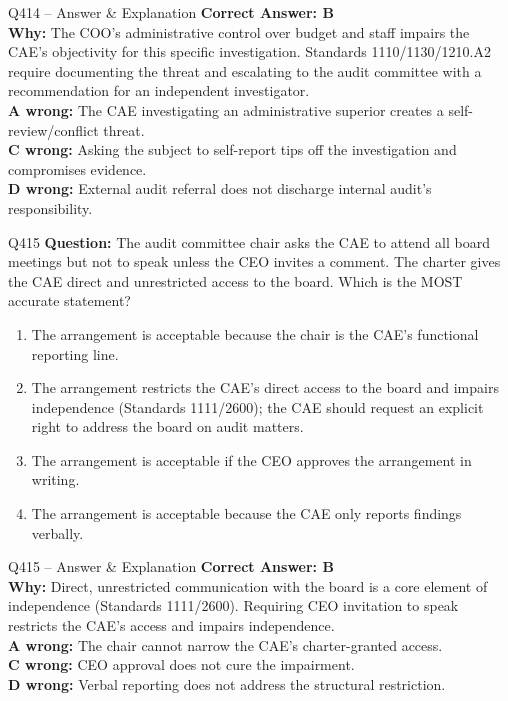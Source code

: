 \documentclass[aspectratio=169,10pt]{beamer}
\begin{document}
	\begin{frame}[t]{Q414 -- Answer \& Explanation}
		\small
		\textbf{Correct Answer: B} \\[4pt]
		\textbf{Why:} The COO's administrative control over budget and staff impairs the CAE's objectivity for this specific investigation. Standards 1110/1130/1210.A2 require documenting the threat and escalating to the audit committee with a recommendation for an independent investigator. \\[4pt]
		\textbf{A wrong:} The CAE investigating an administrative superior creates a self-review/conflict threat. \\[2pt]
		\textbf{C wrong:} Asking the subject to self-report tips off the investigation and compromises evidence. \\[2pt]
		\textbf{D wrong:} External audit referral does not discharge internal audit's responsibility.
	\end{frame}
	
	\begin{frame}[t]{Q415}
		\small
		\textbf{Question:} The audit committee chair asks the CAE to attend all board meetings but not to speak unless the CEO invites a comment. The charter gives the CAE direct and unrestricted access to the board. Which is the MOST accurate statement?
		\begin{enumerate}[label=\Alph*.,itemsep=1pt,topsep=2pt]
			\item The arrangement is acceptable because the chair is the CAE's functional reporting line.
			\item The arrangement restricts the CAE's direct access to the board and impairs independence (Standards 1111/2600); the CAE should request an explicit right to address the board on audit matters.
			\item The arrangement is acceptable if the CEO approves the arrangement in writing.
			\item The arrangement is acceptable because the CAE only reports findings verbally.
		\end{enumerate}
	\end{frame}
	
	\begin{frame}[t]{Q415 -- Answer \& Explanation}
		\small
		\textbf{Correct Answer: B} \\[4pt]
		\textbf{Why:} Direct, unrestricted communication with the board is a core element of independence (Standards 1111/2600). Requiring CEO invitation to speak restricts the CAE's access and impairs independence. \\[4pt]
		\textbf{A wrong:} The chair cannot narrow the CAE's charter-granted access. \\[2pt]
		\textbf{C wrong:} CEO approval does not cure the impairment. \\[2pt]
		\textbf{D wrong:} Verbal reporting does not address the structural restriction.
	\end{frame}
	
\end{document}
